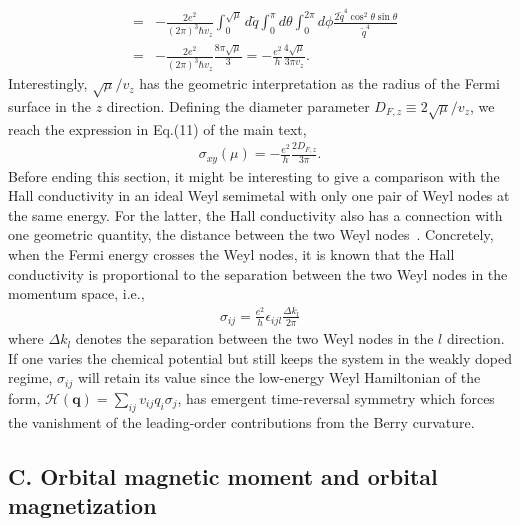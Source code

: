\documentclass[aps,prl,twocolumn,longbibliography]{revtex4-1}
\newcommand{\bq}{\boldsymbol q}
\begin{document}
\begin{widetext}
\begin{eqnarray}
&=&-\frac{2e^{2}}{(2\pi)^{3}\hbar v_{z}}\int_{0}^{\sqrt{\mu}}d\tilde{q}\int_{0}^{\pi}d\theta\int_{0}^{2\pi}d\phi \frac{2\tilde{q}^{4}\cos^{2}\theta\sin\theta}{\tilde{q}^{4}}\nonumber\\
&=&-\frac{2e^{2}}{(2\pi)^{3}\hbar v_{z}}\frac{8\pi\sqrt{\mu}}{3}=-\frac{e^{2}}{h}\frac{4\sqrt{\mu}}{3\pi v_{z}}.\label{Hall}
\end{eqnarray}
Interestingly, $\sqrt{\mu}/v_{z}$ has the geometric interpretation as the radius of the Fermi surface in the $z$ direction. Defining
the diameter parameter $D_{F,z}\equiv2\sqrt{\mu}/v_{z}$, we reach the expression in Eq.(11) of the main text,
\begin{eqnarray}
\sigma_{xy}(\mu)=-\frac{e^{2}}{h}\frac{2D_{F,z}}{3\pi}.
\end{eqnarray}
Before ending this section, it might be interesting to give a comparison with the Hall conductivity
in an ideal Weyl semimetal with only one pair of Weyl nodes at the same energy. For the latter, the Hall
conductivity also has a connection with one geometric quantity, the distance between the two Weyl nodes~\cite{yang2011}.
Concretely,  when the Fermi energy crosses the Weyl nodes, it is known that the Hall conductivity is proportional
to the separation between the two Weyl nodes in the momentum space, i.e.,
\begin{eqnarray}
\sigma_{ij}=\frac{e^{2}}{h}\epsilon_{ijl}\frac{\Delta k_{l}}{2\pi}
\end{eqnarray}
where $\Delta k_{l}$ denotes the separation between the two Weyl nodes in
the $l$ direction. If one varies the chemical potential but still keeps the system in the weakly
doped regime, $\sigma_{ij}$ will retain its value since the low-energy Weyl Hamiltonian of the form,
$\mathcal{H}(\bq)=\sum_{ij}v_{ij}q_{i}\sigma_{j}$,
has emergent time-reversal symmetry which forces the vanishment of the leading-order contributions from
the Berry curvature.

\subsection{C. Orbital magnetic moment and orbital magnetization}


\end{widetext}
\end{document}
